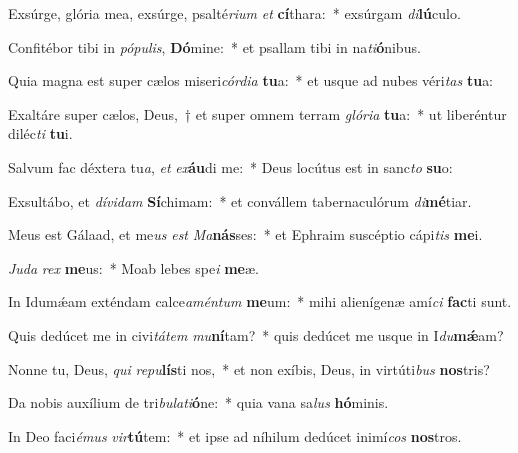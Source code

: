 \item Exsúrge, glória mea, exsúrge, psalté\textit{ri}\textit{um} \textit{et} \textbf{cí}thara:~* exsúrgam \textit{di}\textbf{lú}culo.
\item Confitébor tibi in \textit{pó}\textit{pu}\textit{lis}, \textbf{Dó}mine:~* et psallam tibi in na\textit{ti}\textbf{ó}nibus.
\item Quia magna est super cælos miseri\textit{cór}\textit{di}\textit{a} \textbf{tu}a:~* et usque ad nubes véri\textit{tas} \textbf{tu}a:
\item Exaltáre super cælos, Deus,~† et super omnem terram \textit{gló}\textit{ri}\textit{a} \textbf{tu}a:~* ut liberéntur diléc\textit{ti} \textbf{tu}i.
\item Salvum fac déxtera tu\textit{a}, \textit{et} \textit{ex}\textbf{áu}di me:~* Deus locútus est in sanc\textit{to} \textbf{su}o:
\item Exsultábo, et \textit{dí}\textit{vi}\textit{dam} \textbf{Sí}chimam:~* et convállem tabernaculórum \textit{di}\textbf{mé}tiar.
\item Meus est Gálaad, et me\textit{us} \textit{est} \textit{Ma}\textbf{nás}ses:~* et Ephraim suscéptio cápi\textit{tis} \textbf{me}i.
\item \textit{Ju}\textit{da} \textit{rex} \textbf{me}us:~* Moab lebes spe\textit{i} \textbf{me}æ.
\item In Idumǽam exténdam calce\textit{a}\textit{mén}\textit{tum} \textbf{me}um:~* mihi alienígenæ amí\textit{ci} \textbf{fac}ti sunt.
\item Quis dedúcet me in civi\textit{tá}\textit{tem} \textit{mu}\textbf{ní}tam?~* quis dedúcet me usque in I\textit{du}\textbf{mǽ}am?
\item Nonne tu, Deus, \textit{qui} \textit{re}\textit{pu}\textbf{lís}ti nos,~* et non exíbis, Deus, in virtúti\textit{bus} \textbf{nos}tris?
\item Da nobis auxílium de tri\textit{bu}\textit{la}\textit{ti}\textbf{ó}ne:~* quia vana sa\textit{lus} \textbf{hó}minis.
\item In Deo faci\textit{é}\textit{mus} \textit{vir}\textbf{tú}tem:~* et ipse ad níhilum dedúcet inimí\textit{cos} \textbf{nos}tros.
